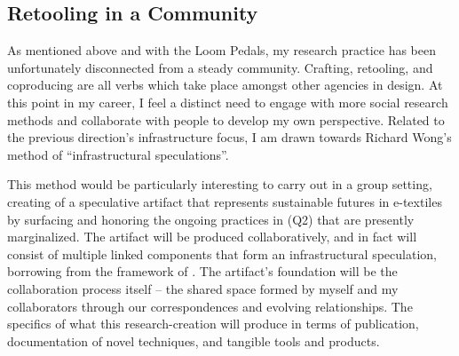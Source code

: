\subsection{Retooling in a Community}

As mentioned above and with the Loom Pedals, my research practice has been unfortunately disconnected from a steady community. Crafting, retooling, and coproducing are all verbs which take place amongst other agencies in design. At this point in my career, I feel a distinct need to engage with more social research methods and collaborate with people to develop my own perspective. Related to the previous direction's infrastructure focus, I am drawn towards Richard Wong's method of ``infrastructural speculations''. 

This method would be particularly interesting to carry out in a group setting, creating of a speculative artifact that represents sustainable futures in e-textiles by surfacing and honoring the ongoing practices in (Q2) that are presently marginalized. The artifact will be produced collaboratively, and in fact will consist of multiple linked components that form an infrastructural speculation, borrowing from the framework of \cite{wong_infrastructural_2020}. The artifact's foundation will be the collaboration process itself -- the shared space formed by myself and my collaborators through our correspondences and evolving relationships. The specifics of what this research-creation will produce in terms of publication, documentation of novel techniques, and tangible tools and products.


